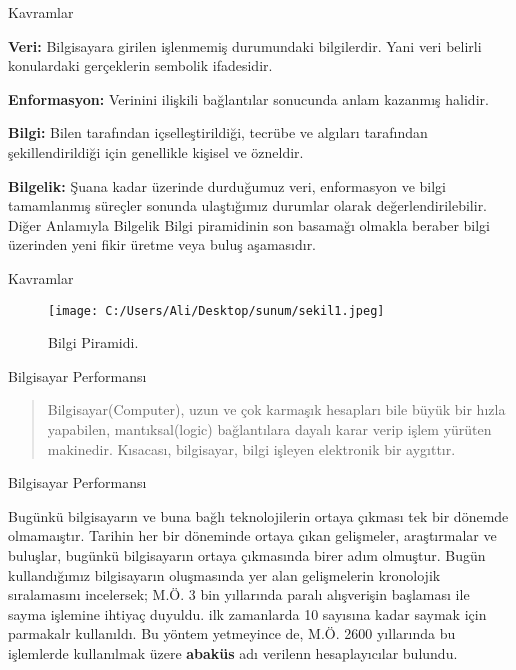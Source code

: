 \documentclass[
  12pt,
  ignorenonframetext,
]{beamer}
\begin{document}
\begin{frame}{Kavramlar}
\protect\hypertarget{kavramlar-1}{}

\justify

\textbf{Veri:} Bilgisayara girilen işlenmemiş durumundaki bilgilerdir.
Yani veri belirli konulardaki gerçeklerin sembolik ifadesidir.

\textbf{Enformasyon:} Verinini ilişkili bağlantılar sonucunda anlam
kazanmış halidir.

\textbf{Bilgi:} Bilen tarafından içselleştirildiği, tecrübe ve algıları
tarafından şekillendirildiği için genellikle kişisel ve özneldir.

\textbf{Bilgelik:} Şuana kadar üzerinde durduğumuz veri, enformasyon ve
bilgi tamamlanmış süreçler sonunda ulaştığımız durumlar olarak
değerlendirilebilir. Diğer Anlamıyla Bilgelik Bilgi piramidinin son
basamağı olmakla beraber bilgi üzerinden yeni fikir üretme veya buluş
aşamasıdır.

\end{frame}

\begin{frame}{Kavramlar}
\protect\hypertarget{kavramlar-2}{}

\begin{figure}
\centering
\texttt{[image: C:/Users/Ali/Desktop/sunum/sekil1.jpeg]}
\caption{Bilgi Piramidi.}
\end{figure}

\end{frame}

\begin{frame}{Bilgisayar Performansı}
\protect\hypertarget{bilgisayar-performansux131}{}

\justify

\begin{quote}
Bilgisayar(Computer), uzun ve çok karmaşık hesapları bile büyük bir
hızla yapabilen, mantıksal(logic) bağlantılara dayalı karar verip işlem
yürüten makinedir. Kısacası, bilgisayar, bilgi işleyen elektronik bir
aygıttır.
\end{quote}

\end{frame}

\begin{frame}{Bilgisayar Performansı}
\protect\hypertarget{bilgisayar-performansux131-1}{}

\justify

Bugünkü bilgisayarın ve buna bağlı teknolojilerin ortaya çıkması tek bir
dönemde olmamaıştır. Tarihin her bir döneminde ortaya çıkan gelişmeler,
araştırmalar ve buluşlar, bugünkü bilgisayarın ortaya çıkmasında birer
adım olmuştur. Bugün kullandığımız bilgisayarın oluşmasında yer alan
gelişmelerin kronolojik sıralamasını incelersek; M.Ö. 3 bin yıllarında
paralı alışverişin başlaması ile sayma işlemine ihtiyaç duyuldu. ilk
zamanlarda 10 sayısına kadar saymak için parmakalr kullanıldı. Bu yöntem
yetmeyince de, M.Ö. 2600 yıllarında bu işlemlerde kullanılmak üzere
\textbf{abaküs} adı verilenn hesaplayıcılar bulundu.

\end{frame}
\end{document}
